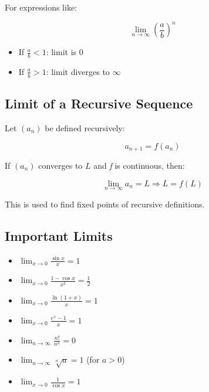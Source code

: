 For expressions like:

\[
    \lim_{n \to \infty} {\left( \frac{a}{b} \right)}^n
\]

\begin{itemize}

    \item If \(\frac{a}{b} < 1\): limit is \(0\)

    \item If \(\frac{a}{b} > 1\): limit diverges to \(\infty\)

\end{itemize}

\subsection{Limit of a Recursive Sequence}

Let \((a_n)\) be defined recursively:

\[
    a_{n+1} = f(a_n)
\]

If \((a_n)\) converges to \(L\) and \emph{f} is continuous, then:

\[
    \lim_{n \to \infty} a_n = L \Rightarrow L = f(L)
\]

This is used to find fixed points of recursive definitions.

\subsection{Important Limits}

\begin{itemize}

    \item \(\displaystyle \lim_{x \to 0} \frac{\sin x}{x} = 1\)

    \item \(\displaystyle \lim_{x \to 0} \frac{1 - \cos x}{x^2} = \frac{1}{2}\)

    \item \(\displaystyle \lim_{x \to 0} \frac{\ln(1 + x)}{x} = 1\)

    \item \(\displaystyle \lim_{x \to 0} \frac{e^x - 1}{x} = 1\)

    \item \(\displaystyle \lim_{n \to \infty} \frac{n!}{n^n} = 0\)

    \item \(\displaystyle \lim_{n \to \infty} \sqrt[n]{a} = 1\) (for \(a > 0\))

    \item \(\displaystyle \lim_{x \to 0} \frac{1}{\cos x} = 1\)

\end{itemize}

